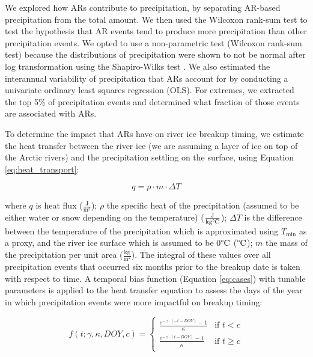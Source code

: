 \documentclass[12pts,draft]{AR_analysis_}
\begin{document}
We explored how ARs contribute to precipitation, by
separating AR-based precipitation from the total amount. We 
then used the Wilcoxon rank-sum test \cite{Rey2011} to test 
the hypothesis 
that AR events tend to produce more precipitation than other
precipitation events. We opted to use a non-parametric 
test (Wilcoxon rank-sum test) 
because the distributions of precipitation were shown to
not be normal after log transformation using the
Shapiro-Wilks test \cite{shapiro_wilk_test}. We also estimated
the interannual variability of precipitation that ARs account for by
conducting a univariate ordinary least squares regression (OLS). 
For extremes, we extracted the top 5\% of precipitation events and determined 
what fraction of those events are associated with ARs. 

To determine the impact that ARs have on river ice breakup timing, 
we estimate the heat transfer between the river ice (we are assuming
a layer of ice on top of the Arctic rivers) and 
the precipitation settling on the surface, 
using Equation \ref{eq:heat_transport}:

\begin{equation}
q = \rho \cdot m \cdot \Delta T 
	\label{eq:heat_transport}
\end{equation}

\noindent where $q$ is heat flux ($\mathrm{\frac{J}{m^2}}$); 
$\rho$ the specific heat 
of the precipitation (assumed to be either water or 
snow depending on the temperature)
($\mathrm{\frac{J}{kg \degree C}}$); $\Delta T$ is the difference between 
the temperature of the precipitation which is approximated 
using $T_{\text{min}}$ as a proxy, and the river ice surface which is
assumed to be $\mathrm{0\degree C}$ ($\mathrm{\degree C}$); $m$ 
the mass of the precipitation per unit area ($\mathrm{\frac{kg}{m^{2}}}$). 
The integral of these values
over all precipitation events that occurred six months prior to the
breakup date is taken with respect to time. A temporal bias function
(Equation \ref{eq:cases})
with tunable parameters is applied to the heat transfer equation to assess 
the days of the year in which  precipitation events were more 
impactful on breakup timing:

\begin{equation}
	\label{eq:cases}
	f(t; \gamma, \kappa, DOY, c) =
	\begin{cases}
    	\frac{e^{-\gamma \cdot (-t - DOY)} - 1}{\kappa} & \text{if }
        	t < c \\
    	\frac{e^{-\gamma \cdot (t - DOY)} - 1}{\kappa} & \text{if }
        	t \geq c \\
	\end{cases}
\end{equation}
\end{document}
